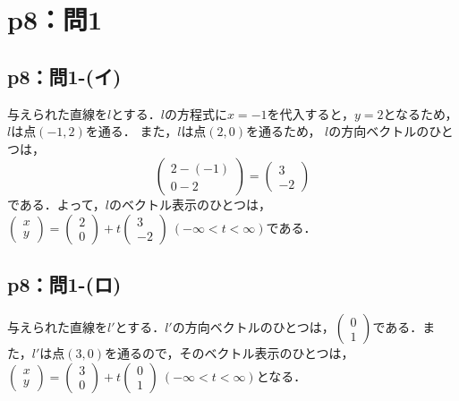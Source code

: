 \documentclass[a4paper,10pt,fleqn]{ltjsarticle}
\begin{document}
\newpage

\section*{p8：問1}


\subsection*{p8：問1-(イ)}

\begin{tleftbar}
  与えられた直線を$l$とする．$l$の方程式に$x=-1$を代入すると，$y=2$となるため，$l$は点$(-1,2)$を通る．
  また，$l$は点$(2,0)$を通るため，
  $l$の方向ベクトルのひとつは，
  \[
    \begin{pmatrix}
      2-(-1) \\
      0-2
    \end{pmatrix}
    =
    \begin{pmatrix}
      3 \\
      -2
    \end{pmatrix}
  \]
  である．よって，$l$のベクトル表示のひとつは，
  $
    \begin{pmatrix}
      x \\
      y
    \end{pmatrix}
    =
    \begin{pmatrix}
      2 \\
      0
    \end{pmatrix}
    +t
    \begin{pmatrix}
      3 \\
      -2
    \end{pmatrix}
    ~(-\infty < t < \infty)$である．
\end{tleftbar}


\subsection*{p8：問1-(ロ)}

\begin{tleftbar}
  与えられた直線を$l'$とする．$l '$の方向ベクトルのひとつは，$
    \begin{pmatrix}
      0 \\
      1
    \end{pmatrix}
  $である．また，$l '$は点$(3,0)$を通るので，そのベクトル表示のひとつは，
  $
    \begin{pmatrix}
      x \\
      y
    \end{pmatrix}
    =
    \begin{pmatrix}
      3 \\
      0
    \end{pmatrix}
    +t
    \begin{pmatrix}
      0 \\
      1
    \end{pmatrix}
    ~(-\infty < t < \infty)
  $となる．
\end{tleftbar}
\end{document}
